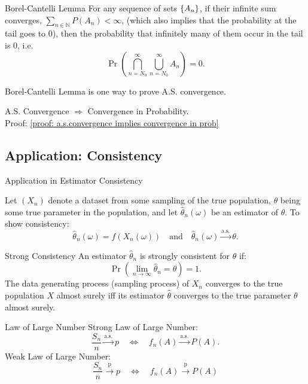 
\begin{lem}{Borel-Cantelli Lemma}
For any sequence of sets $\qty{A_n}$, if their infinite sum converges, \(\sum_{n \in \mathbb{N}} P(A_n) < \infty\), (which also implies that the probability at the tail goes to 0), then the probability that infinitely many of them occur in the tail is 0, i.e.
\[
\Pr\left(\bigcap_{n=N_0}^\infty \bigcup_{n=N_0}^\infty A_n \right) = 0.
\]
\end{lem}

\begin{rmk}
Borel-Cantelli Lemma is one way to prove A.S. convergence.
\end{rmk}

\begin{prop}{}
A.S. Convergence $\Rightarrow$ Convergence in Probability. \\
Proof: \ref{proof: a.s.convergence implies convergence in prob}
\end{prop}


\subsection{Application: Consistency}

\begin{eg}{Application in Estimator Consistency}

Let \((X_n)\) denote a dataset from some sampling of the true population, $\theta$ being some true parameter in the population, and let \(\hat{\theta}_n(\omega)\) be an estimator of \(\theta\). To show consistency:
\[
\hat{\theta}_n(\omega) = f(X_n(\omega)) \quad \text{and} \quad \hat{\theta}_n(\omega) \xrightarrow{\text{a.s.}} \theta.
\]
\end{eg}

\begin{df}{Strong Consistency}
An estimator \(\hat{\theta}_n\) is strongly consistent for \(\theta\) if:
\[
\Pr\left(\lim_{n \to \infty} \hat{\theta}_n = \theta\right) = 1.
\]
The data generating process (sampling process) of $X_n$ converges to the true population $X$ almost surely iff its estimator $\hat\theta$ converges to the true parameter $\theta$ almost surely. 
\end{df}



\begin{thm}{Law of Large Number}
Strong Law of Large Number: 
\[
\frac{S_n}{n} \xrightarrow{\text{a.s.}} p \quad \Leftrightarrow \quad f_n(A) \xrightarrow{\text{a.s.}} P(A).
\]
Weak Law of Large Number: 
\[
\frac{S_n}{n} \xrightarrow{\text{p}} p \quad \Leftrightarrow \quad f_n(A) \xrightarrow{\text{p}} P(A) 
\]
\end{thm}

